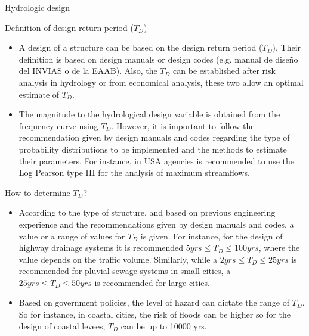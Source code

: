 \documentclass[8pt]{beamer}
\renewcommand{\emph}[1]{\textcolor{myorange}{#1}}
\begin{document}
\begin{frame}{Hydrologic design}
   \begin{block}{Definition of design return period ($T_D$)}
   \end{block}
   \begin{itemize}
       \item A \emph{design of a structure} can be based on the \alert{design return period ($T_D$)}. Their definition is based on \emph{design manuals} or \emph{design codes} (e.g. manual de  diseño del INVIAS o de la EAAB). Also, the $T_D$ can be established after \emph{risk analysis in hydrology} or from \emph{economical analysis}, these two allow an optimal estimate of $T_D$. 
       \item The magnitude to the hydrological design variable is obtained from the \emph{frequency curve} using $T_D$. However, it is important to follow the recommendation given by \emph{design manuals} and \emph{codes} regarding the type of \emph{probability distributions} to be implemented and the methods to estimate their parameters. For instance, in USA agencies is recommended to use the \emph{Log Pearson type III} for the analysis of \emph{maximum streamflows}. 
   \end{itemize}

   \alert{How to determine $T_D$?}\\
              \begin{itemize}
                  \item According to the \emph{type of structure}, and based on previous \emph{engineering experience} and the recommendations given by \emph{design manuals} and \emph{codes}, a value or a range of values for $T_D$ is given. For instance, for the design of \emph{highway drainage systems} it is recommended $5 yrs \leq T_D \leq 100 yrs$, where the value depends on the traffic volume. Similarly, while a $2 yrs \leq T_D \leq 25 yrs$ is recommended for \emph{pluvial sewage systems} in small cities, a $25  yrs \leq T_D \leq 50 yrs$ is recommended for large cities. 
                  \item Based on \emph{government policies}, the level of hazard can dictate the range of $T_D$. So for instance, in coastal cities, the risk of floods can be higher so for the design of  \emph{coastal levees},  $T_D$ can be up to 10000 yrs. 
              \end{itemize}
\end{frame}
\end{document}
